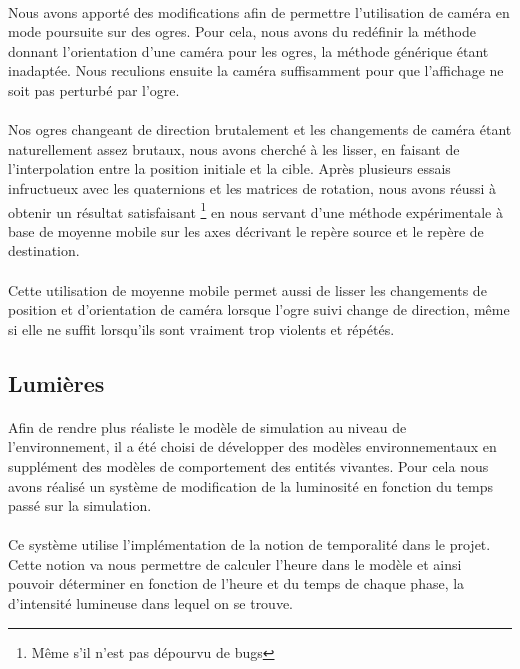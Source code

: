 \paragraph{}
Nous avons apporté des modifications afin de permettre l'utilisation de caméra
en mode poursuite sur des ogres. Pour cela, nous avons du redéfinir la méthode
donnant l'orientation d'une caméra pour les ogres, la méthode générique étant
inadaptée. Nous reculions ensuite la caméra suffisamment pour que l'affichage ne
soit pas perturbé par l'ogre.

\paragraph{}
Nos ogres changeant de direction brutalement et les changements de caméra étant
naturellement assez brutaux, nous avons cherché à les lisser, en faisant de
l'interpolation entre la position initiale et la cible. Après plusieurs essais
infructueux avec les quaternions et les matrices de rotation, nous avons réussi
à obtenir un résultat satisfaisant \footnote{Même s'il n'est pas dépourvu de
bugs} en nous servant d'une méthode expérimentale à base de moyenne mobile sur
les axes décrivant le repère source et le repère de destination.

\paragraph{}
Cette utilisation de moyenne mobile permet aussi de lisser les changements de
position et d'orientation de caméra lorsque l'ogre suivi change de direction,
même si elle ne suffit lorsqu'ils sont vraiment trop violents et répétés.

\subsection{Lumières}
\paragraph{}
Afin de rendre plus réaliste le modèle de simulation au niveau de
l'environnement, il a été choisi de développer des modèles environnementaux en
supplément des modèles de comportement des entités vivantes. Pour cela nous
avons réalisé un système de modification de la luminosité en fonction du temps
passé sur la simulation.

\paragraph{}
Ce système utilise l'implémentation de la notion de temporalité dans le projet.
Cette notion va nous permettre de calculer l'heure dans le modèle et ainsi
pouvoir déterminer en fonction de l'heure et du temps de chaque phase, la
d'intensité lumineuse dans lequel on se trouve.

